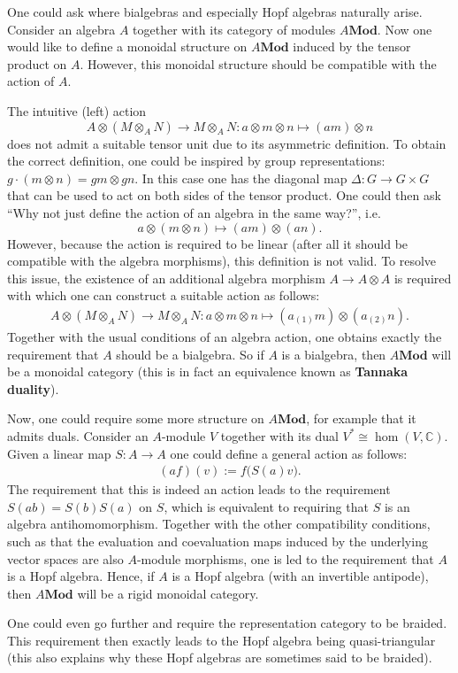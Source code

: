     \begin{remark}
        One could ask where bialgebras and especially Hopf algebras naturally arise. Consider an algebra $A$ together with its category of modules $A\mathbf{Mod}$. Now one would like to define a monoidal structure on $A\mathbf{Mod}$ induced by the tensor product on $A$. However, this monoidal structure should be compatible with the action of $A$.

        The intuitive (left) action \[A\otimes(M\otimes_A N)\rightarrow M\otimes_AN: a\otimes m\otimes n\mapsto (am)\otimes n\] does not admit a suitable tensor unit due to its asymmetric definition. To obtain the correct definition, one could be inspired by group representations: $g\cdot(m\otimes n) = gm\otimes gn$. In this case one has the diagonal map $\Delta:G\rightarrow G\times G$ that can be used to act on both sides of the tensor product. One could then ask ``Why not just define the action of an algebra in the same way?'', i.e. \[a\otimes (m\otimes n)\mapsto (am)\otimes(an).\] However, because the action is required to be linear (after all it should be compatible with the algebra morphisms), this definition is not valid. To resolve this issue, the existence of an additional algebra morphism $A\rightarrow A\otimes A$ is required with which one can construct a suitable action as follows:
        \begin{gather}
            A\otimes(M\otimes_AN)\rightarrow M\otimes_AN:a\otimes m\otimes n\mapsto (a_{(1)}m)\otimes(a_{(2)}n).
        \end{gather}
        Together with the usual conditions of an algebra action, one obtains exactly the requirement that $A$ should be a bialgebra. So if $A$ is a bialgebra, then $A\mathbf{Mod}$ will be a monoidal category (this is in fact an equivalence known as \textbf{Tannaka duality}).

        Now, one could require some more structure on $A\mathbf{Mod}$, for example that it admits duals. Consider an $A$-module $V$ together with its dual $V^*\cong\hom(V,\mathbb{C})$. Given a linear map $S:A\rightarrow A$ one could define a general action as follows:
        \begin{gather}
            (af)(v) := f\big(S(a)v\big).
        \end{gather}
        The requirement that this is indeed an action leads to the requirement $S(ab) = S(b)S(a)$ on $S$, which is equivalent to requiring that $S$ is an algebra antihomomorphism. Together with the other compatibility conditions, such as that the evaluation and coevaluation maps induced by the underlying vector spaces are also $A$-module morphisms, one is led to the requirement that $A$ is a Hopf algebra. Hence, if $A$ is a Hopf algebra (with an invertible antipode), then $A\mathbf{Mod}$ will be a rigid monoidal category.

        One could even go further and require the representation category to be braided. This requirement then exactly leads to the Hopf algebra being quasi-triangular (this also explains why these Hopf algebras are sometimes said to be braided).
    \end{remark}

